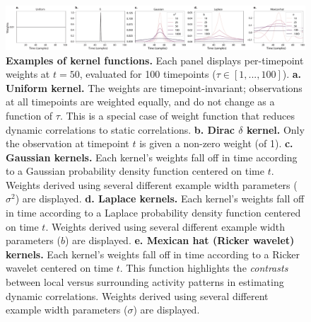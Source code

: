 \documentclass[english]{article}
\begin{document}
\begin{figure}
  \centering
  \includegraphics[width=\textwidth]{figs/kernels}
  \caption{\textbf{Examples of kernel functions.} Each panel
    displays per-timepoint weights at $t = 50$, evaluated for 100
    timepoints ($\tau \in \left[1, ..., 100\right]$).  \textbf{a. Uniform
      kernel.} The weights are timepoint-invariant; observations at
    all timepoints are weighted equally, and do not change as a
    function of $\tau$.  This is a special case of weight function that
    reduces dynamic correlations to static correlations.
    \textbf{b. Dirac $\delta$ kernel.} Only the observation at
    timepoint $t$ is given a non-zero weight (of 1).
    \textbf{c. Gaussian kernels.} Each kernel's weights fall off
    in time according to a Gaussian probability density function
    centered on time $t$.  Weights derived using several different
    example width parameters ($\sigma^2$) are displayed.
    \textbf{d. Laplace kernels.}  Each kernel's weights fall off
    in time according to a Laplace probability density function
    centered on time $t$.  Weights derived using several different
    example width parameters ($b$) are displayed.  \textbf{e. Mexican
      hat (Ricker wavelet) kernels.}  Each kernel's weights fall
    off in time according to a Ricker wavelet centered on time $t$.  This
    function highlights the \textit{contrasts} between local versus
    surrounding activity patterns in estimating dynamic
    correlations. Weights derived using several different example
    width parameters ($\sigma$) are displayed.}
  \label{fig:kernels}
\end{figure}
\end{document}
